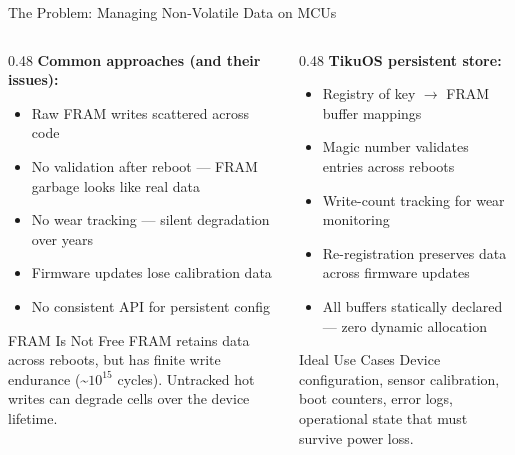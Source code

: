 \documentclass[aspectratio=169, 10pt]{beamer}
\begin{document}
\begin{frame}{The Problem: Managing Non-Volatile Data on MCUs}
\begin{columns}[T]
\begin{column}{0.48\textwidth}
\textbf{Common approaches (and their issues):}
\begin{itemize}
  \item Raw FRAM writes scattered across code
  \item No validation after reboot --- FRAM garbage looks like real data
  \item No wear tracking --- silent degradation over years
  \item Firmware updates lose calibration data
  \item No consistent API for persistent config
\end{itemize}

\vspace{0.5em}
\begin{alertblock}{FRAM Is Not Free}
FRAM retains data across reboots, but has finite write endurance
(\textasciitilde$10^{15}$ cycles). Untracked hot writes can degrade cells
over the device lifetime.
\end{alertblock}
\end{column}

\begin{column}{0.48\textwidth}
\textbf{TikuOS persistent store:}
\begin{itemize}
  \item Registry of key $\rightarrow$ FRAM buffer mappings
  \item Magic number validates entries across reboots
  \item Write-count tracking for wear monitoring
  \item Re-registration preserves data across firmware updates
  \item All buffers statically declared --- zero dynamic allocation
\end{itemize}

\vspace{0.5em}
\begin{block}{Ideal Use Cases}
Device configuration, sensor calibration, boot counters,
error logs, operational state that must survive power loss.
\end{block}
\end{column}
\end{columns}
\end{frame}

\end{document}
